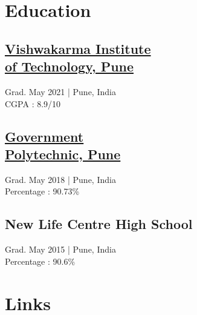 \documentclass[]{deedy-resume-openfont}
\begin{document}
%
%
\lastupdated

%
%

%
%

\begin{minipage}[t]{0.33\textwidth} 


\section{Education}  
\vspace{5pt}
\subsection{\href{https://www.vit.edu/}{Vishwakarma Institute \\of Technology, Pune}}
Grad. May 2021 | Pune, India\\
CGPA : 8.9/10
\sectionsep


\subsection{\href{https://gppune.ac.in/userindex.php}{Government \\Polytechnic, Pune}}
Grad. May 2018 | Pune, India\\
Percentage : 90.73\%
\sectionsep

\subsection{New Life Centre High School}
Grad. May 2015 | Pune, India\\
Percentage : 90.6\%
\sectionsep


\section{Links} 
\vspace{5pt}


\end{minipage}
\end{document}
